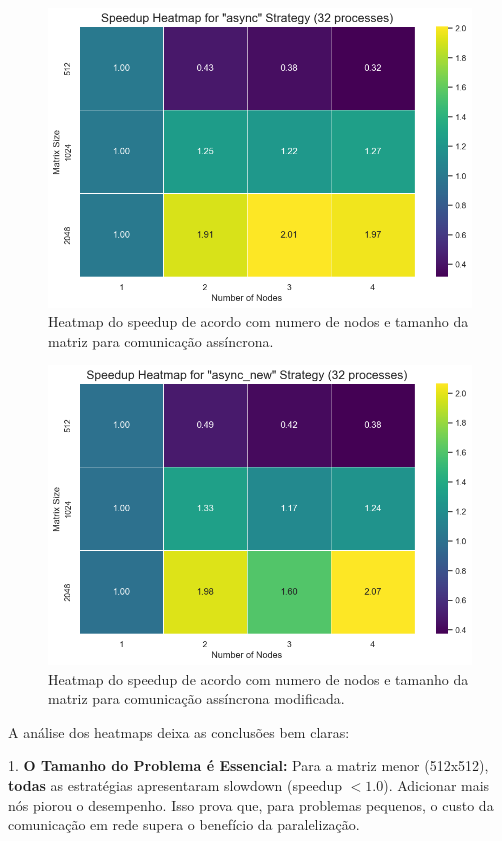 \documentclass{article}
\begin{document}
\begin{figure}[H]
    \centering
    \includegraphics[width=0.8\linewidth]{images/speedup_async.png}
    \caption{Heatmap do speedup de acordo com numero de nodos e tamanho da matriz para comunicação assíncrona.}
    \label{fig:speedup_async}
\end{figure}

\begin{figure}[H]
    \centering
    \includegraphics[width=0.8\linewidth]{images/speedup_async_new.png}
    \caption{Heatmap do speedup de acordo com numero de nodos e tamanho da matriz para comunicação assíncrona modificada.}
    \label{fig:speedup_async_new}
\end{figure}

A análise dos heatmaps deixa as conclusões bem claras:

1.  \textbf{O Tamanho do Problema é Essencial:} Para a matriz menor (512x512), \textbf{todas} as estratégias apresentaram slowdown (speedup $< 1.0$). Adicionar mais nós piorou o desempenho. Isso prova que, para problemas pequenos, o custo da comunicação em rede supera o benefício da paralelização.
\end{document}

